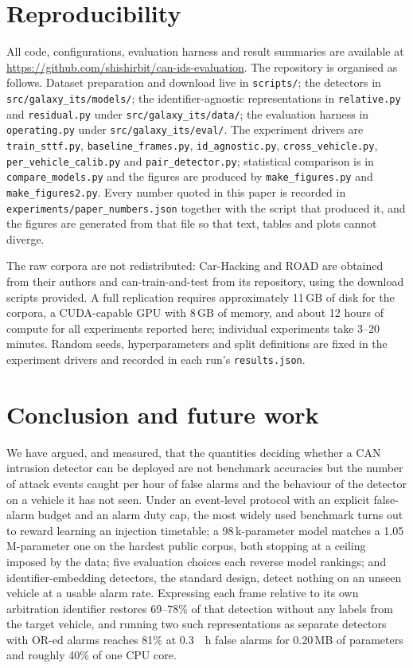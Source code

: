 \documentclass[preprint,11pt,authoryear]{elsarticle}
\begin{document}
\section{Reproducibility}
\label{sec:repro}

All code, configurations, evaluation harness and result summaries are available at
\url{https://github.com/shishirbit/can-ids-evaluation}. \sloppy The repository is organised as follows. Dataset
preparation and download live in \texttt{scripts/}; the detectors in
\texttt{src/galaxy\_its/models/}; the identifier-agnostic representations in
\texttt{relative.py} and \texttt{residual.py} under \texttt{src/galaxy\_its/data/}; the
evaluation harness in \texttt{operating.py} under \texttt{src/galaxy\_its/eval/}. The experiment
drivers are \texttt{train\_sttf.py}, \texttt{baseline\_frames.py}, \texttt{id\_agnostic.py},
\texttt{cross\_vehicle.py}, \texttt{per\_vehicle\_calib.py} and \texttt{pair\_detector.py};
statistical comparison is in \texttt{compare\_models.py} and the figures are produced by
\texttt{make\_figures.py} and \texttt{make\_figures2.py}. Every number quoted in this paper is
recorded in \texttt{experiments/paper\_numbers.json} together with the script that produced it, and
the figures are generated from that file so that text, tables and plots cannot diverge.

The raw corpora are not redistributed: Car-Hacking and ROAD are obtained from their authors and
can-train-and-test from its repository, using the download scripts provided. A full replication
requires approximately 11\,GB of disk for the corpora, a CUDA-capable GPU with 8\,GB of memory, and
about 12 hours of compute for all experiments reported here; individual experiments take 3--20
minutes. Random seeds, hyperparameters and split definitions are fixed in the experiment drivers and
recorded in each run's \texttt{results.json}.

\section{Conclusion and future work}
\label{sec:conclusion}

We have argued, and measured, that the quantities deciding whether a CAN intrusion detector can be
deployed are not benchmark accuracies but the number of attack events caught per hour of false
alarms and the behaviour of the detector on a vehicle it has not seen. Under an event-level protocol
with an explicit false-alarm budget and an alarm duty cap, the most widely used benchmark turns out
to reward learning an injection timetable; a 98\,k-parameter model matches a 1.05\,M-parameter one on
the hardest public corpus, both stopping at a ceiling imposed by the data; five evaluation choices
each reverse model rankings; and identifier-embedding detectors, the standard design, detect nothing
on an unseen vehicle at a usable alarm rate. Expressing each frame relative to its own arbitration
identifier restores 69--78\% of that detection without any labels from the target vehicle, and
running two such representations as separate detectors with OR-ed alarms reaches 81\% at
\SI{0.3}{\per\hour} false alarms for 0.20\,MB of parameters and roughly 40\% of one CPU core.
\end{document}
